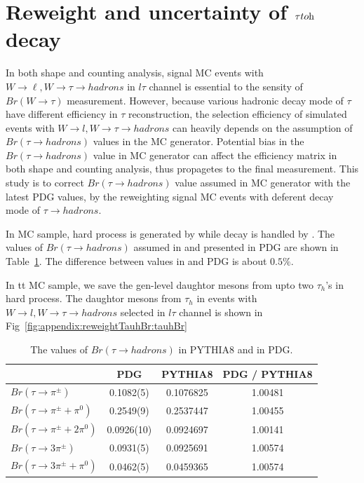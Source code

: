 \section{Reweight and uncertainty of $\tau\to \rm h$ decay}

In both shape and counting analysis, signal MC events with $W\to\ell,
W\to\tau\to hadrons$ in $l\tau$ channel is essential to the sensity of
$Br(W\to\tau)$ measurement.  However, because various hadronic decay
mode of $\tau$ have different efficiency in $\tau$ reconstruction, the
selection efficiency of simulated events with $W\to l, W\to\tau\to
hadrons$ can heavily depends on the assumption of $Br(\tau\to hadrons)$
values in the MC generator.  Potential bias in the $Br(\tau\to hadrons)$
value in MC generator can affect the efficiency matrix in both shape and
counting analysis, thus propagetes to the final measurement.  This study
is to correct $Br(\tau\to hadrons)$ value assumed in MC generator with
the latest PDG values, by the reweighting signal MC events with deferent
decay mode of $\tau\to hadrons$.

In \ttbar MC sample, hard process is generated by \POWHEG while \tau
decay is handled by .  The values of $Br(\tau\to hadrons)$
assumed in  and presented in PDG are shown in
Table~\ref{tab:tauhReweighting}. The difference between values in
 and PDG is about $0.5\%$.


In tt MC sample, we save the gen-level daughtor mesons from upto two
$\tau_h$'s in hard process.  The daughtor mesons from $\tau_h$ in events
with $W\to l, W\to\tau\to hadrons$ selected in $l\tau$ channel is shown
in Fig~\ref{fig:appendix:reweightTauhBr:tauhBr}


\begin{table}[]
  \centering
  \begin{tabular}{l|c|c|c}
  \hline
                              & PDG        & PYTHIA8   & PDG / PYTHIA8 \\
  \hline
  $Br(\tau\to \pi^\pm)$       & 0.1082(5)  & 0.1076825 & 1.00481       \\
  $Br(\tau\to \pi^\pm+ \pi^0)$& 0.2549(9)  & 0.2537447 & 1.00455       \\
  $Br(\tau\to \pi^\pm+2\pi^0)$& 0.0926(10) & 0.0924697 & 1.00141       \\
  $Br(\tau\to3\pi^\pm)$       & 0.0931(5)  & 0.0925691 & 1.00574       \\
  $Br(\tau\to3\pi^\pm+ \pi^0)$& 0.0462(5)  & 0.0459365 & 1.00574       \\
  \hline
  \end{tabular}
  \caption{ The values of $Br(\tau\to hadrons)$ in PYTHIA8 and in PDG.
  \label{tab:tauhReweighting}}
\end{table}


